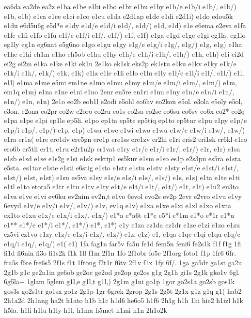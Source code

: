 {{ea6da
ea2de
ea2z
e1ba
e1be
e1bi
e1bo
e1br
e1bu
e1by
e1b/e
e1b/i
e1b/,
e1b/)
e1b,
e1b)
e1ca
e1ce
e1ci
e1co
e1cu
e1da
e2d1ap
e1de
e1di
e2d1i)
e1do
edou5k
e1du
e6d5u6g
e5d*e
e1dy
e1d/e
e1d/i
e1d/,
e1d/)
e1d,
e1d)
e1e
e6ema
e2eva
e1fa
e1fe
e1fi
e1fo
e1fu
e1f/e
e1f/i
e1f/,
e1f/)
e1f,
e1f)
e1ga
e1gd
e1ge
e1gi
eg1la.
eg1lo
eg1ly
eg1n
eg6nat
e5g6no
e1go
e1gu
e1gy
e1g/e
e1g/i
e1g/,
e1g/)
e1g,
e1g)
e1ha
e1he
e1hi
eh1m
e1ho
eh5ob
e1hu
e1hy
e1h/e
e1h/i
e1h/,
e1h/)
e1h,
e1h)
e1i
ei2d
ei2g
ei2m
e1ka
e1ke
e1ki
ek1n
2e1ko
ek1sk
eks2p
ek1stu
e1ku
e1kv
e1ky
e1k/e
e1k/i
e1k/,
e1k/)
e1k,
e1k)
e1la
e1le
e1li
e1lo
e1lu
e1ly
e1l/e
e1l/i
e1l/,
e1l/)
e1l,
e1l)
e1ma
e1me
e5mi
em1ne
e1mo
e1mu
e1my
e1m/e
e1m/i
e1m/,
e1m/)
e1m,
em1q
e1m)
e1na
e1ne
e1ni
e1no
2enr
en5re
en1ri
e1nu
e1ny
e1n/e
e1n/i
e1n/,
e1n/)
e1n,
e1n)
2e1o
eo2b
eob1l
e2odi
e5ohl
eo6hv
eo2kon
e5ol.
e3ola
e5oly
e5ol,
e3on.
e2ona
eo2pr
eo2w
e2oro
eo2ru
eo1s
eo2sa
eo2se
eo6su
eo6sv
eo6x
eo2*
eo2q
e1pa
e1pe
e1pi
ep1le
ep5li.
e1po
ep1ta
ep5te
ep5tiq
ep1to
ep5tur
e1pu
e1py
e1p/e
e1p/i
e1p/,
e1p/)
e1p,
e1p)
e1wa
e1we
e1wi
e1wo
e1wu
e1w/e
e1w/i
e1w/,
e1w/)
e1ra
er1a(
e1re
ere1dv
ere5gn
ere1p
ere1ss
ere1zv
er2hi
e1ri
eris2
eri1sk
er6kl
e1ro
ero6b
er5tli
er1t,
e1ru
e2r1u2p
er1vat
e1ry
e1r/e
e1r/i
e1r/,
e1r/)
e1r,
e1r)
e1sa
e1sb
e1sd
e1se
e1s2g
e1si
e1sk
eskrip1
es5kur
e1sm
e1so
es1p
e2s3pu
es5ra
e1sta
e5sta.
es1tar
e1ste
e1sti
e6stig
e1sto
e1str
e1stu
e1stv
e1sty
e1st/e
e1st/i
e1st/,
e1st/)
e1st,
e1st)
e1su
es5va
e1sy
e1s/e
e1s/i
e1s/,
e1s/)
e1s,
e1s)
e1ta
e1te
e1ti
e1tl
e1to
etora5
e1tr
e1tu
e1tv
e1ty
e1t/e
e1t/i
e1t/,
e1t/)
e1t,
e1t)
e1u2
eu3to
e1va
e1ve
e1vi
ev6ku
ev2nim
ev2n,t
e1vo
6evol
evo2s
ev2p
2evr
e2vro
e1vu
e1vy
6evyd
e1v/e
e1v/i
e1v/,
e1v/)
e1v,
ev1q
e1v)
e1xa
e1xe
e1xi
e1xl
e1xo
e1xta
ex1to
e1xu
e1x/e
e1x/i
e1x/,
e1x/)
e1*a
e*a6t
e1*e
e5*i
e*1m
e1*o
e*1r
e1*u
e1**
e1*/e
e1*/i
e1*/,
e1*/)
e1*,
e1*)
e1y
e1za
ez1da
ez1dr
e1ze
e1zi
e1zo
e1zu
ez5vi
ez1vo
e1zy
e1z/e
e1z/i
e1z/,
e1z/)
e1z,
e1z)
e1,
e1qa
e1qe
e1qi
e1qu
e1q/e
e1q/i
e1q/,
e1q/)
e1(
e1)
1fa
fag1n
far5v
fa5u
fe1d
fem5n
feni6
fe2s1k
f1f
f1g
1fi
fi1d
fi6nin
fi3o
fi1s2k
f1k
1fl
f1m
2f1n
1fo
2f1obr
fo5e
2f1org
foto1
f1p
1fr6
6fr.
fra5s
f6re
fre6s5
2f1s
f1t
1ftong
f2t1r
f6tv
2f1v
f1x
1fy
6f/.
1ga
ga5dr
ga1st
ga2u
2g1b
g1c
ge2n1in
ge6ob
ge2oc
ge2od
ge2op
ge2os
g1g
2g1h
gi1s
2g1k
gko1v
6gl.
6g5la+
1glam
5glem
g1l,e
g1l,t
g1l,)
2g1m
g1ni
go1p
1gor
go2s1a
go2sb
gos1k
gos3s
go2s1tr
go1sx
go1z
2g1p
1gr
6grek
2grop
2g1s
2g5t
2g1x
g1z
g1q
g1(
hab2
2h1a2d
2h1ang
ha2t
h1ato
h1b
h1c
h1d6
he6o5
h1f6
2h1g
h1h
1hi
hie2
h1izl
h1k
h5la.
h1li
h1lu
h1ly
h1l,
h1ma
h5met
h1mi
h1n
2h1o2k
}}
